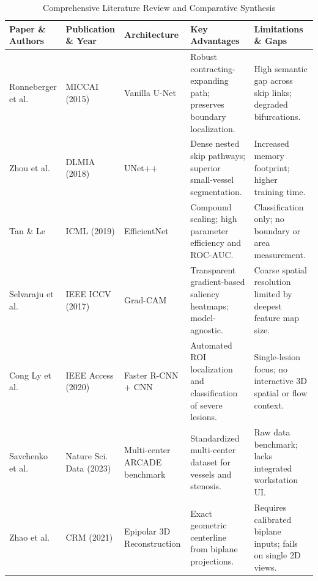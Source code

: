 \begin{table}[H]
\centering
\caption{Comprehensive Literature Review and Comparative Synthesis}
\label{tab:literature_survey}
\small
\begin{tabular}{p{2.5cm}p{2.5cm}p{1.8cm}p{3.8cm}p{3.8cm}}
\toprule
\textbf{Paper \& Authors} & \textbf{Publication \& Year} & \textbf{Architecture} & \textbf{Key Advantages} & \textbf{Limitations \& Gaps} \\
\midrule
Ronneberger et al.~\cite{ronneberger2015u} & MICCAI (2015) & Vanilla U-Net & Robust contracting-expanding path; preserves boundary localization. & High semantic gap across skip links; degraded bifurcations. \\
Zhou et al.~\cite{zhou2018unetplusplus} & DLMIA (2018) & UNet++ & Dense nested skip pathways; superior small-vessel segmentation. & Increased memory footprint; higher training time. \\
Tan \& Le~\cite{tan2019efficientnet} & ICML (2019) & EfficientNet & Compound scaling; high parameter efficiency and ROC-AUC. & Classification only; no boundary or area measurement. \\
Selvaraju et al.~\cite{selvaraju2017gradcam} & IEEE ICCV (2017) & Grad-CAM & Transparent gradient-based saliency heatmaps; model-agnostic. & Coarse spatial resolution limited by deepest feature map size. \\
Cong Ly et al.~\cite{congly2020stenosis} & IEEE Access (2020) & Faster R-CNN + CNN & Automated ROI localization and classification of severe lesions. & Single-lesion focus; no interactive 3D spatial or flow context. \\
Savchenko et al.~\cite{arcade2023challenge} & Nature Sci. Data (2023) & Multi-center ARCADE benchmark & Standardized multi-center dataset for vessels and stenosis. & Raw data benchmark; lacks integrated workstation UI. \\
Zhao et al.~\cite{zhao2021coronary} & CRM (2021) & Epipolar 3D Reconstruction & Exact geometric centerline from biplane projections. & Requires calibrated biplane inputs; fails on single 2D views. \\
\bottomrule
\end{tabular}
\end{table}

